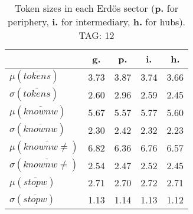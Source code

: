\begin{table}[h!]
\begin{center}
\begin{tabular}{| l || c | c | c | c |}\hline
 & {\bf g.} & {\bf p.} & {\bf i.} & {\bf h.} \\\hline\hline
$\mu(\overline{tokens})$ & 3.73  & 3.87  & 3.74  & 3.66 \\
$\sigma(\overline{tokens})$ & 2.60  & 2.96  & 2.59  & 2.45 \\\hline
$\mu(\overline{knownw})$ & 5.67  & 5.57  & 5.77  & 5.60 \\
$\sigma(\overline{knownw})$ & 2.30  & 2.42  & 2.32  & 2.23 \\\hline
$\mu(\overline{knownw \neq})$ & 6.82  & 6.36  & 6.76  & 6.57 \\
$\sigma(\overline{knownw \neq})$ & 2.54  & 2.47  & 2.52  & 2.45 \\\hline
$\mu(\overline{stopw})$ & 2.71  & 2.70  & 2.72  & 2.71 \\
$\sigma(\overline{stopw})$ & 1.13  & 1.14  & 1.13  & 1.12 \\\hline
\end{tabular}
\caption{Token sizes in each Erd\"os sector ({{\bf p.}} for periphery, {{\bf i.}} for intermediary, {{\bf h.}} for hubs). TAG: 12}
\end{center}
\end{table}